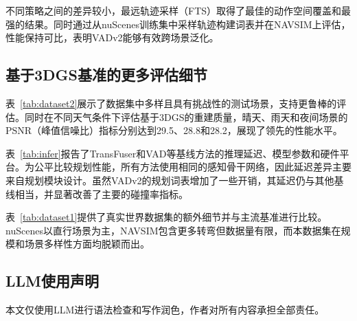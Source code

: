 \documentclass{article} %
\begin{document}
不同策略之间的差异较小，最远轨迹采样（FTS）取得了最佳的动作空间覆盖和最强的结果。同时通过从nuScenes训练集中采样轨迹构建词表并在NAVSIM上评估，性能保持可比，表明VADv2能够有效跨场景泛化。

\subsection{基于3DGS基准的更多评估细节}

表~\ref{tab:dataset2}展示了数据集中多样且具有挑战性的测试场景，支持更鲁棒的评估。同时在不同天气条件下评估基于3DGS的重建质量，晴天、雨天和夜间场景的PSNR（峰值信噪比）指标分别达到29.5、28.8和28.2，展现了领先的性能水平。

表~\ref{tab:infer}报告了TransFuser和VAD等基线方法的推理延迟、模型参数和硬件平台。为公平比较规划性能，所有方法使用相同的感知骨干网络，因此延迟差异主要来自规划模块设计。虽然VADv2的规划词表增加了一些开销，其延迟仍与其他基线相当，并显著改善了主要的碰撞率指标。

表~\ref{tab:dataset1}提供了真实世界数据集的额外细节并与主流基准进行比较。nuScenes以直行场景为主，NAVSIM包含更多转弯但数据量有限，而本数据集在规模和场景多样性方面均脱颖而出。


\subsection{LLM使用声明}
本文仅使用LLM进行语法检查和写作润色，作者对所有内容承担全部责任。

\begin{table}[b]
\vspace{-2mm}
\caption{真实世界基于3DGS数据集的定量分析。}
\vspace{-1mm}
\centering
{}
\label{tab:dataset1}
\end{table}
\end{document}
